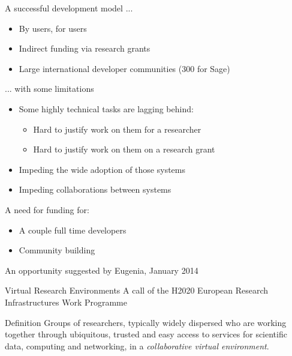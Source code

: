 \documentclass[
  usenames,svgnames, %
  compress,
  ]{beamer}
\begin{document}
\begin{frame}
  \begin{block}{A successful development model ...}
    \begin{itemize}
    \item By users, for users
    \item Indirect funding via research grants
    \item Large international developer communities (300 for Sage)
    \end{itemize}
  \end{block}
  \pause

  \begin{block}{... with some limitations}
    \begin{itemize}
    \item Some highly technical tasks are lagging behind:
      \begin{itemize}
      \item Hard to justify work on them for a researcher
      \item Hard to justify work on them on a research grant
      \end{itemize}
    \item Impeding the wide adoption of those systems
    \item Impeding collaborations between systems
    \end{itemize}
  \end{block}
  \pause

  \begin{block}{A need for funding for:}
    \begin{itemize}
    \item A couple full time developers
    \item Community building
    \end{itemize}
  \end{block}
\end{frame}

\begin{frame}{An opportunity suggested by Eugenia, January 2014}

  \begin{block}{Virtual Research Environments}
    A call of the H2020 European Research Infrastructures Work Programme
  \end{block}
  \pause

  \begin{block}{Definition}
    Groups of researchers, typically widely dispersed who are working
    together through ubiquitous, trusted and easy access to services
    for scientific data, computing and networking, in a
    \emph{collaborative virtual environment}.
  \end{block}
\end{frame}
\end{document}
